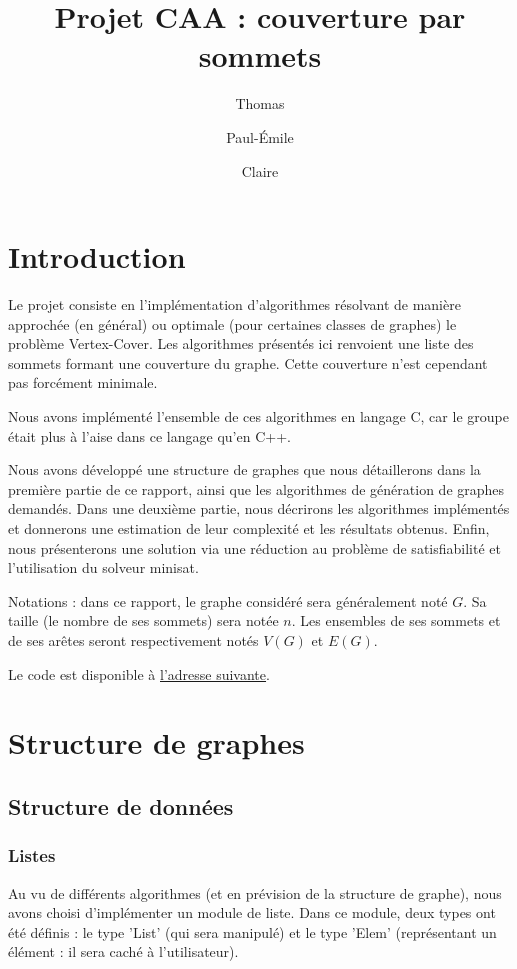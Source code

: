 \documentclass[a4paper,10pt]{article}
\title{Projet CAA : couverture par sommets}
\author{Thomas \bsc{Bellitto}\and Paul-Émile \bsc{Boutoille} \and Claire \bsc{Pennarun}}
\date{}
\begin{document}
\maketitle

\section*{Introduction}

Le projet consiste en l'implémentation d'algorithmes résolvant de manière approchée (en général) ou optimale (pour certaines classes de graphes) le problème Vertex-Cover.
Les algorithmes présentés ici renvoient une liste des sommets formant une couverture du graphe. Cette couverture n'est cependant pas forcément minimale.

Nous avons implémenté l'ensemble de ces algorithmes en langage C, car le groupe était plus à l'aise dans ce langage qu'en C++.

Nous avons développé une structure de graphes que nous détaillerons dans la première partie de ce rapport, ainsi que les algorithmes de génération de graphes demandés.
Dans une deuxième partie, nous décrirons les algorithmes implémentés et donnerons une estimation de leur complexité et les résultats obtenus.
Enfin, nous présenterons une solution via une réduction au problème de satisfiabilité et l'utilisation du solveur minisat.

Notations : dans ce rapport, le graphe considéré sera généralement noté $G$. Sa taille (le nombre de ses sommets) sera notée $n$. Les ensembles de ses sommets et de ses arêtes seront respectivement notés $V(G)$ et $E(G)$.

Le code est disponible à \href{http://github.com/ClairePennarun/CAA_Vertex_Cover }{l'adresse suivante}.

\section{Structure de graphes}

\subsection{Structure de données}

\subsubsection{Listes}

Au vu de différents algorithmes (et en prévision de la structure de graphe), nous avons choisi d'implémenter un module de liste.
Dans ce module, deux types ont été définis : le type 'List' (qui sera manipulé) et le type 'Elem' (représentant un élément : il sera caché à l'utilisateur).
\end{document}
